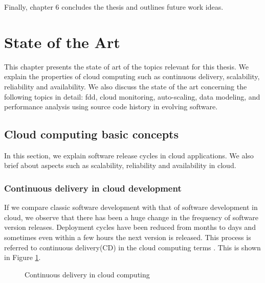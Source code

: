 \documentclass[article,type=msc,colorback,12pt,accentcolor=tud8b,table]{tudthesis}
\begin{document}
	Finally, chapter 6 concludes the thesis and outlines future work ideas.


	\cleardoublepage
 
 \hfill 
 \section{State of the Art}
  \hfill \break
 	
	This chapter presents the state of art of the topics relevant for this thesis. We explain the properties of cloud computing such as continuous delivery, scalability, reliability and availability. We also discuss the state of the art concerning the following topics in detail: \gls{fdd}, cloud monitoring, auto-scaling, data modeling, and performance analysis using source code history in evolving software.
	
		\subsection{Cloud computing basic concepts}
		
		In this section, we explain software release cycles in cloud applications. We also brief about aspects such as scalability, reliability and availability in cloud.
		
		\subsubsection{Continuous delivery in cloud development}
		If we compare classic software development with that of software development in cloud, we observe that there has been a huge change in the frequency of software version releases. Deployment cycles have been reduced from months to days and sometimes even within a few hours the next version is released. This process is referred to continuous delivery(CD) in the cloud computing terms \cite{humble2010continuous}. This is shown in Figure \ref{fig:cd}. 
		
		\begin{figure}
			\begin{center}
			\end{center}
			\caption{Continuous delivery in cloud computing \cite{humble2010continuous}}
			\label{fig:cd}
		\end{figure}
		
\end{document}
